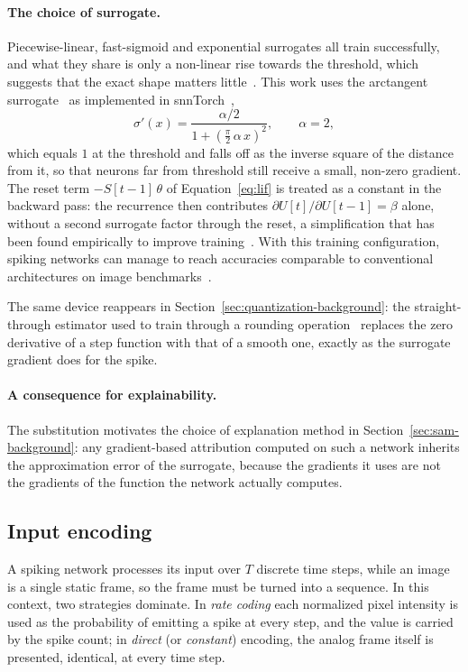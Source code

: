 \paragraph{The choice of surrogate.} Piecewise-linear, fast-sigmoid and
exponential surrogates all train successfully, and what they share is only a
non-linear rise towards the threshold, which suggests that the exact shape
matters little~\cite{neftci2019surrogate}. This work uses the
arctangent surrogate~\cite{fang2021plif} as implemented in
snnTorch~\cite{eshraghian2023},
\begin{equation}
\sigma'(x) = \frac{\alpha/2}{1 + \left(\frac{\pi}{2}\,\alpha\, x\right)^{2}},
\qquad \alpha = 2,
\end{equation}
which equals $1$ at the threshold and falls off as the inverse square of the
distance from it, so that neurons far from threshold still receive a small,
non-zero gradient. The reset term $-S[t-1]\,\theta$ of
Equation~\ref{eq:lif} is treated as a constant in the backward pass: the
recurrence then contributes $\partial U[t]/\partial U[t-1] = \beta$ alone, without
a second surrogate factor through the reset, a simplification that has been
found empirically to improve training~\cite{neftci2019surrogate}. With this training
configuration, spiking networks can manage to reach accuracies comparable to conventional architectures
on image benchmarks~\cite{eshraghian2023}.

The same device reappears in Section~\ref{sec:quantization-background}: the
straight-through estimator used to train through a rounding
operation~\cite{bengio2013ste} replaces the zero derivative of a step function
with that of a smooth one, exactly as the surrogate gradient does for the spike.

\paragraph{A consequence for explainability.} The substitution motivates the
choice of explanation method in Section~\ref{sec:sam-background}: any
gradient-based attribution computed on such a network inherits the
approximation error of the surrogate, because the gradients it uses are not the
gradients of the function the network actually computes.

\subsection{Input encoding}
\label{sec:encoding}

A spiking network processes its input over $T$ discrete time steps, while an
image is a single static frame, so the frame must be turned into a sequence. In this context, two
strategies dominate. In \emph{rate coding} each normalized pixel intensity is
used as the probability of emitting a spike at every step, and the value is
carried by the spike count; in \emph{direct} (or \emph{constant}) encoding, the
analog frame itself is presented, identical, at every time step.


